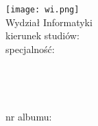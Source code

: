 %

\begingroup
\firaoldstyle  %
\centering %
\thispagestyle{empty} %

    \texttt{[image: wi.png]}\\[.75cm]

Wydział Informatyki\\[.25cm]
kierunek studiów: \field\\[.25cm]
specjalność: \speciality\\[1.75cm]
{\Large \degreename}\\[1cm]

\Large {\bfseries \MakeUppercase  \ttitle }\\[.5cm]%
\large {\bfseries \MakeUppercase \ttitleEng} \\[.5cm]%

{\large \bfseries \authornames}\\[.5cm]
{nr albumu: \bfseries {\noalbum}}\\[1cm]

